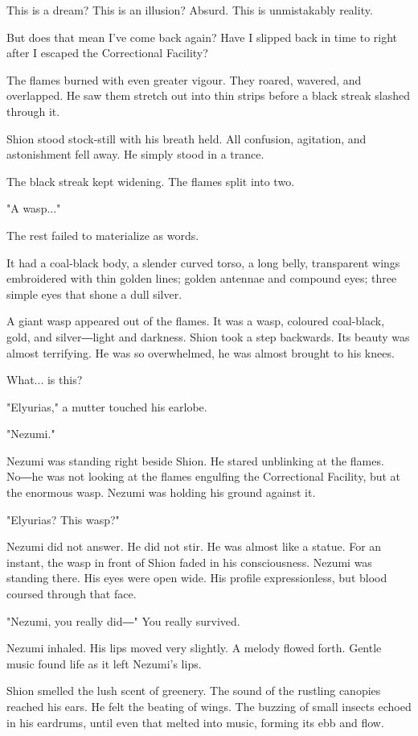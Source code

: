 This is a dream? This is an illusion? Absurd. This is unmistakably
reality.

But does that mean I've come back again? Have I slipped back in time to
right after I escaped the Correctional Facility?

The flames burned with even greater vigour. They roared, wavered, and
overlapped. He saw them stretch out into thin strips before a black
streak slashed through it.

Shion stood stock-still with his breath held. All confusion, agitation,
and astonishment fell away. He simply stood in a trance.

The black streak kept widening. The flames split into two.

"A wasp..."

The rest failed to materialize as words.

It had a coal-black body, a slender curved torso, a long belly,
transparent wings embroidered with thin golden lines; golden antennae
and compound eyes; three simple eyes that shone a dull silver.

A giant wasp appeared out of the flames. It was a wasp, coloured
coal-black, gold, and silver―light and darkness. Shion took a step
backwards. Its beauty was almost terrifying. He was so overwhelmed, he
was almost brought to his knees.

What... is this?

"Elyurias," a mutter touched his earlobe.

"Nezumi."

Nezumi was standing right beside Shion. He stared unblinking at the
flames. No―he was not looking at the flames engulfing the Correctional
Facility, but at the enormous wasp. Nezumi was holding his ground
against it.

"Elyurias? This wasp?"

Nezumi did not answer. He did not stir. He was almost like a statue. For
an instant, the wasp in front of Shion faded in his consciousness.
Nezumi was standing there. His eyes were open wide. His profile
expressionless, but blood coursed through that face.

"Nezumi, you really did―" You really survived.

Nezumi inhaled. His lips moved very slightly. A melody flowed forth.
Gentle music found life as it left Nezumi's lips.

Shion smelled the lush scent of greenery. The sound of the rustling
canopies reached his ears. He felt the beating of wings. The buzzing of
small insects echoed in his eardrums, until even that melted into music,
forming its ebb and flow.

